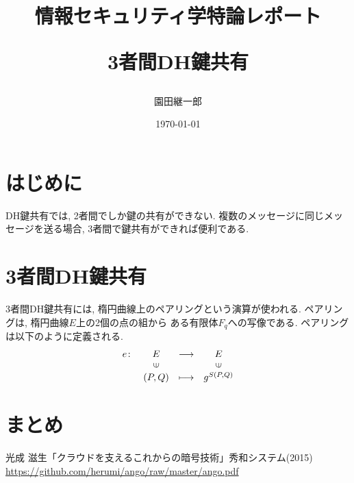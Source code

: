 \documentclass[a4paper,11pt]{jsarticle}
\begin{document}
\title{情報セキュリティ学特論レポート

3者間DH鍵共有}
\author{園田継一郎}
\date{\today}
\maketitle

\section{はじめに}
DH鍵共有では, 2者間でしか鍵の共有ができない.
複数のメッセージに同じメッセージを送る場合, 
3者間で鍵共有ができれば便利である.

\section{3者間DH鍵共有}
3者間DH鍵共有には, 楕円曲線上のペアリングという演算が使われる.
ペアリングは, 楕円曲線$E$上の2個の点の組から
ある有限体$F_q$への写像である\cite{bib1}.
ペアリングは以下のように定義される.
\[
  \begin{array}{rccc}
    e \colon & E & \longrightarrow & E \\
            & \rotatebox{90}{$\in$} & & \rotatebox{90}{$\in$} \\
            & (P, Q) & \longmapsto & g^{S(P, Q)}
  \end{array}
\]

\section{まとめ}

\begin{thebibliography}{99}
  光成 滋生「クラウドを支えるこれからの暗号技術」秀和システム(2015) \url{https://github.com/herumi/ango/raw/master/ango.pdf}
\end{thebibliography}
\end{document}

